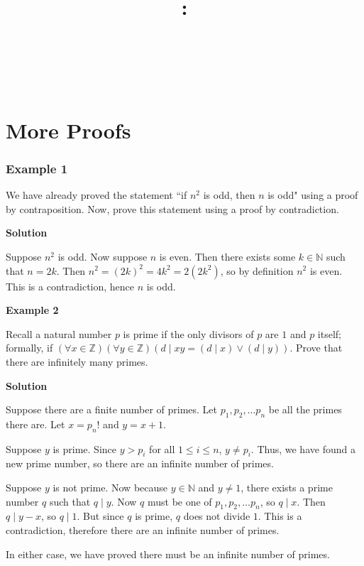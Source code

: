 \documentclass{article}
\title{
    \vspace{2in}
    \textbf{\lectClass:\\ \lectTitle}\\
    \vspace{0.1in}\large{\textit{\lectClassInstructor\ \lectSection}}
    \vspace{3in}
    \author{\textbf{\lectAuthorName}}
    \date{}
}
\begin{document}
\maketitle
\pagebreak

\section*{More Proofs}
    \subsubsection*{Example 1}
    We have already proved the statement ``if $n^{2}$ is odd, then $n$ is odd" using a proof by contraposition. Now, prove this statement using a proof by contradiction.
    
    \vspace{1.5mm}
    \textbf{Solution}
    
    \vspace{1.5mm}
    Suppose $n^{2}$ is odd. Now suppose $n$ is even. Then there exists some $k \in \mathbb{N}$ such that $n = 2k$. Then $n^{2} = (2k)^{2} = 4k^{2} = 2(2k^{2})$, so by definition $n^{2}$ is even. This is a contradiction, hence $n$ is odd.
    
    \vspace{1.5mm}
    \textbf{Example 2}
    
    \vspace{1.5mm}
    Recall a natural number $p$ is prime if the only divisors of $p$ are $1$ and $p$ itself; formally, if $(\forall x \in \mathbb{Z})(\forall y \in \mathbb{Z})(d \mid xy = (d \mid x) \lor (d \mid y))$. Prove that there are infinitely many primes.
    

    \vspace{1.5mm}
    \textbf{Solution}
    
    \vspace{1.5mm}
    Suppose there are a finite number of primes. Let $p_1, p_2, \dots p_n$ be all the primes there are. Let $x = p_n!$ and $y = x + 1$.
    
    \begin{Cases}
        \item Suppose $y$ is prime. Since $y > p_{i}$ for all $1 \le i \le n$, $y \ne p_{i}$. Thus, we have found a new prime number, so there are an infinite number of primes.
        \item Suppose $y$ is not prime. Now because $y \in \mathbb{N}$ and $y \ne 1$, there exists a prime number $q$ such that $q \mid y$. Now $q$ must be one of $p_1, p_2, \dots p_n$, so $q \mid x$. Then $q \mid y - x$, so $q \mid 1$. But since $q$ is prime, $q$ does not divide $1$. This is a contradiction, therefore there are an infinite number of primes.
    \end{Cases}
    In either case, we have proved there must be an infinite number of primes.
    
\end{document}
